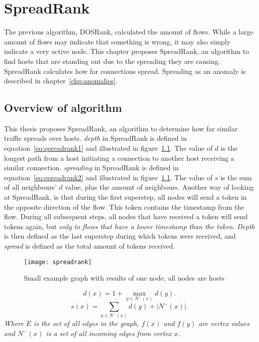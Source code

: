 \chapter{SpreadRank}
\label{chp:spreadrank}

The previous algorithm, DOSRank, calculated the amount of flows.
While a large amount of flows may indicate that something is wrong,
 it may also simply indicate a very active node.
This chapter proposes SpreadRank, an algorithm to find hosts that are standing out due to the spreading they are causing.
SpreadRank calculates how far connections spread.
Spreading as an anomaly is described in chapter~\ref{chp:anomalies}.


\section{Overview of algorithm}
This thesis proposes SpreadRank, an algorithm to determine how far similar traffic spreads over hosts.
\emph{depth} in SpreadRank is defined in equation~\ref{eq:spreadrank1} and illustrated in figure~\ref{fig:spreadrank}.
The value of $d$ is the longest path from a host initiating a connection to another host receiving a similar connection.
\emph{spreading} in SpreadRank is defined in equation~\ref{eq:spreadrank2} and illustrated in figure~\ref{fig:spreadrank}.
The value of $s$ is the sum of all neighbours' $d$ value, plus the amount of neighbours.
Another way of looking at SpreadRank, is that during the first superstep, all nodes will send a token in the opposite direction of the flow.
This token contains the timestamp from the flow.
During all subsequent steps, all nodes that have received a token will send tokens again, but \emph{only to flows that have a lower timestamp than the token}.
\emph{Depth} is then defined as the last superstep during which tokens were received, and \emph{spread} is defined as the total amount of tokens received.


\begin{figure}[h]
	\caption{Small example graph with results of one node, all nodes are hosts}
	\label{fig:spreadrank}
	\centering
		\texttt{[image: spreadrank]}
\end{figure}
\begin{equation}
	\label{eq:spreadrank1}
	d(x) = 1 + \max_{y \in N^{-}(x)} d(y).
\end{equation}
\begin{equation}
	\label{eq:spreadrank2}
	\displaystyle s(x) = \sum_{y \in N^{-}(x)} d(y) + \left\vert{N^{-}(x)}\right\vert.
\end{equation}
\emph{Where $E$ is the set of all edges in the graph, $f(x)$ and $f(y)$ are vertex values and $N^{-}(x)$ is a set of all incoming edges from vertex $x$.}



